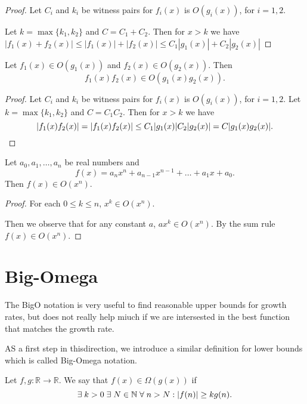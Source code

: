 \begin{proof}
    Let $C_i$ and $k_i$ be witness pairs for $f_i(x)$ is $O(g_i(x))$, for $i=1,2$.
    
    Let $k=\max\{k_1,k_2\}$ and $C=C_1+C_2$. Then for $x>k$ we have $|f_1(x)+f_2(x)|\leq|f_1(x)|+|f_2(x)|\leq C_1|g_1(x)|+C_2|g_2(x)|$
\end{proof}

\begin{theorem}
    Let $f_1(x) \in O(g_1(x))$ and $f_2(x) \in O(g_2(x))$. Then \[ f_1(x)f_2(x) \in O(g_1(x)g_2(x)). \]
\end{theorem}

\begin{proof}
    Let $C_i$ and $k_i$ be witness pairs for $f_i(x)$ is $O(g_i(x))$, for $i = 1, 2$. Let $k=\max\{ k_1, k_2 \}$ and $C = C_1 C_2$. Then for $x > k$ we have \[ \lvert f_1(x) f_2(x)\rvert = \lvert f_1(x) f_2(x)\rvert \leq  C_1 \lvert g_1(x)\rvert C_2 \lvert g_2(x)\rvert = C \lvert g_1(x) g_2(x)\rvert. \]
\end{proof}

\begin{proposition}
    Let $a_0,a_1,\ldots,a_n$ be real numbers and \[f(x)=a_nx^n+a_{n-1}x^{n-1}+\ldots+a_1x+a_0.\] Then $f(x)\in O(x^n)$.
\end{proposition}

\begin{proof}
    For each $0\leq k\leq n$, $x^k\in O(x^n)$.
    
    Then we observe that for any constant $a$, $ax^k\in O(x^n)$. By the sum rule $f(x)\in O(x^n)$.
\end{proof}

\section{Big-Omega}

The BigO notation is very useful to find reasonable upper bounds for growth rates, but does not really help miuch if we are intersested in the best function that matches the growth rate.

AS a first step in thisdirection, we introduce a similar definition for lower bounds which is called Big-Omega notation.

\begin{definition}
    Let $f, g : \mathbb R \to \mathbb R$. We say that $f(x) \in \Omega(g(x))$ if \[ \exists \; k > 0 \; \exists \; N \in \mathbb N \; \forall \; n > N : \lvert f(n)\rvert \geq k g(n). \]
\end{definition}

